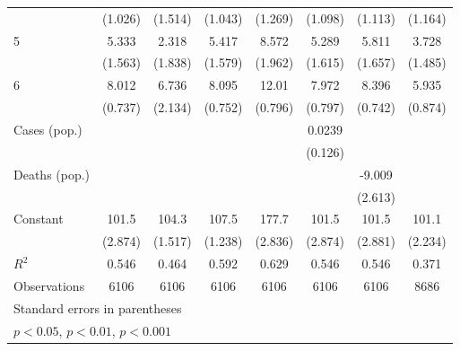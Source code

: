 \documentclass{article}
\begin{document}
{\begin{longtable}{l*{7}{c}}
                &  (1.026)         &  (1.514)         &  (1.043)         &  (1.269)         &  (1.098)         &  (1.113)         &  (1.164)         \\
5               &    5.333\sym{**} &    2.318         &    5.417\sym{**} &    8.572\sym{***}&    5.289\sym{**} &    5.811\sym{**} &    3.728\sym{*}  \\
                &  (1.563)         &  (1.838)         &  (1.579)         &  (1.962)         &  (1.615)         &  (1.657)         &  (1.485)         \\
6               &    8.012\sym{***}&    6.736\sym{**} &    8.095\sym{***}&    12.01\sym{***}&    7.972\sym{***}&    8.396\sym{***}&    5.935\sym{***}\\
                &  (0.737)         &  (2.134)         &  (0.752)         &  (0.796)         &  (0.797)         &  (0.742)         &  (0.874)         \\
Cases (pop.)    &                  &                  &                  &                  &   0.0239         &                  &                  \\
                &                  &                  &                  &                  &  (0.126)         &                  &                  \\
Deaths (pop.)   &                  &                  &                  &                  &                  &   -9.009\sym{**} &                  \\
                &                  &                  &                  &                  &                  &  (2.613)         &                  \\
Constant        &    101.5\sym{***}&    104.3\sym{***}&    107.5\sym{***}&    177.7\sym{***}&    101.5\sym{***}&    101.5\sym{***}&    101.1\sym{***}\\
                &  (2.874)         &  (1.517)         &  (1.238)         &  (2.836)         &  (2.874)         &  (2.881)         &  (2.234)         \\
\hline
\(R^{2}\)       &    0.546         &    0.464         &    0.592         &    0.629         &    0.546         &    0.546         &    0.371         \\
Observations    &     6106         &     6106         &     6106         &     6106         &     6106         &     6106         &     8686         \\
\hline\hline
\multicolumn{8}{l}{\footnotesize Standard errors in parentheses}\\
\multicolumn{8}{l}{\footnotesize \sym{*} \(p<0.05\), \sym{**} \(p<0.01\), \sym{***} \(p<0.001\)}\\
\end{longtable}
}
\end{document}
